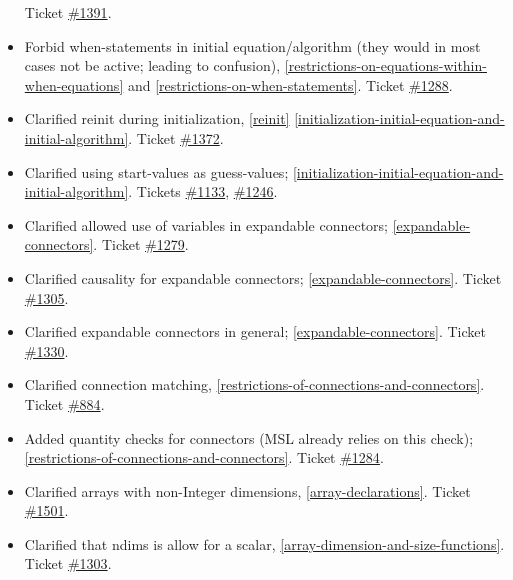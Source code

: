 \begin{itemize}
  Ticket \href{https://github.com/modelica/ModelicaSpecification/issues/1391}{\#1391}.
\item
  Forbid when-statements in initial equation/algorithm (they would in
  most cases not be active; leading to confusion), \autoref{restrictions-on-equations-within-when-equations} and
  \autoref{restrictions-on-when-statements}. Ticket
  \href{https://github.com/modelica/ModelicaSpecification/issues/1288}{\#1288}.
\item
  Clarified reinit during initialization, \autoref{reinit} \autoref{initialization-initial-equation-and-initial-algorithm}. Ticket
  \href{https://github.com/modelica/ModelicaSpecification/issues/1372}{\#1372}.
\item
  Clarified using start-values as guess-values; \autoref{initialization-initial-equation-and-initial-algorithm}. Tickets
  \href{https://github.com/modelica/ModelicaSpecification/issues/1133}{\#1133},
  \href{https://github.com/modelica/ModelicaSpecification/issues/1246}{\#1246}.
\item
  Clarified allowed use of variables in expandable connectors; \autoref{expandable-connectors}. Ticket
  \href{https://github.com/modelica/ModelicaSpecification/issues/1279}{\#1279}.
\item
  Clarified causality for expandable connectors; \autoref{expandable-connectors}. Ticket
  \href{https://github.com/modelica/ModelicaSpecification/issues/1305}{\#1305}.
\item
  Clarified expandable connectors in general; \autoref{expandable-connectors}. Ticket
  \href{https://github.com/modelica/ModelicaSpecification/issues/1330}{\#1330}.
\item
  Clarified connection matching, \autoref{restrictions-of-connections-and-connectors}. Ticket
  \href{https://github.com/modelica/ModelicaSpecification/issues/884}{\#884}.
\item
  Added quantity checks for connectors (MSL already relies on this
  check); \autoref{restrictions-of-connections-and-connectors}. Ticket
  \href{https://github.com/modelica/ModelicaSpecification/issues/1284}{\#1284}.
\item
  Clarified arrays with non-Integer dimensions, \autoref{array-declarations}. Ticket
  \href{https://github.com/modelica/ModelicaSpecification/issues/1501}{\#1501}.
\item
  Clarified that ndims is allow for a scalar, \autoref{array-dimension-and-size-functions}. Ticket
  \href{https://github.com/modelica/ModelicaSpecification/issues/1303}{\#1303}.

\end{itemize}
